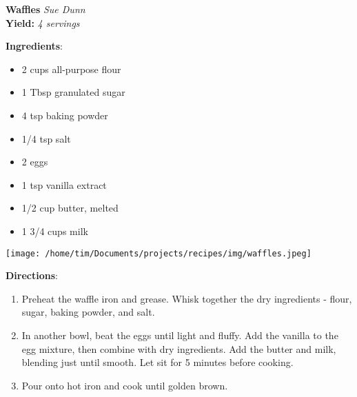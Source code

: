 \documentclass[11pt, twoside, openany]{book}
\begin{document}
\noindent\begin{minipage}[t]{\linewidth}%
{\Large\textbf{Waffles}} \label{waffles}\hfill\textit{Sue Dunn}\\
\textbf{Yield:} \textit{4 servings}\\
\noindent\begin{minipage}[t]{0.78\linewidth}%
\textbf{Ingredients}:\vspace{-3mm}
\begin{multicols}{2}
\begin{itemize}\setlength\itemsep{-1mm}
\item 2 cups all-purpose flour
\item 1 Tbsp granulated sugar
\item 4 tsp baking powder
\item 1/4 tsp salt
\item 2 eggs
\item 1 tsp vanilla extract
\item 1/2 cup butter, melted
\item 1 3/4 cups milk
\end{itemize}
\end{multicols}
\end{minipage}
\noindent\begin{minipage}[t]{0.18\linewidth}
\centering \strut\vspace*{-\baselineskip}\newline
\texttt{[image: /home/tim/Documents/projects/recipes/img/waffles.jpeg]}\\
\end{minipage}\vspace{3mm}
\textbf{Directions}:
\vspace{-3mm}\begin{enumerate}\setlength\itemsep{-1mm}
\item Preheat the waffle iron and grease. Whisk together the dry ingredients - flour, sugar, baking powder, and salt.
\item In another bowl, beat the eggs until light and fluffy. Add the vanilla to the egg mixture, then combine with dry ingredients. Add the butter and milk, blending just until smooth. Let sit for 5 minutes before cooking.
\item Pour onto hot iron and cook until golden brown.
\end{enumerate}
\end{minipage}\vspace{8mm}
\end{document}
